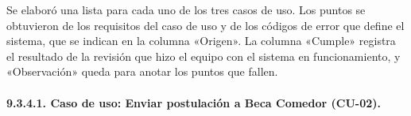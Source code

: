 
Se elaboró una lista para cada uno de los tres casos de uso. Los puntos se obtuvieron de los requisitos del caso de uso y de los códigos de error que define el sistema, que se indican en la columna «Origen». La columna «Cumple» registra el resultado de la revisión que hizo el equipo con el sistema en funcionamiento, y «Observación» queda para anotar los puntos que fallen.

\paragraph{9.3.4.1. Caso de uso: Enviar postulación a Beca Comedor (CU-02).}

